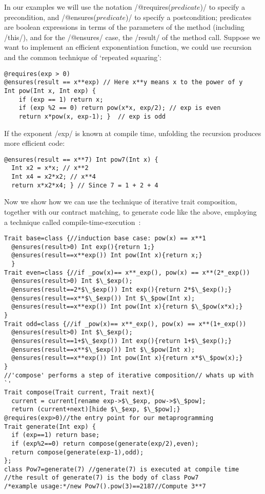 In our examples we will use the notation /@requires($predicate$)/ 
to specify a precondition, and /@ensures($predicate$)/ 
to specify a postcondition; predicates are boolean expressions
in terms of the parameters of the method (including /this/), and for the /@ensures/ case, the /result/ of the method call.
Suppose we want to implement an efficient exponentiation function, we could use recursion and the common technique of `repeated squaring':
\vspace{-1ex}
\begin{lstlisting}
@requires(exp > 0)
@ensures(result == x**exp) // Here x**y means x to the power of y
Int pow(Int x, Int exp) {
	if (exp == 1) return x;
	if (exp %2 == 0) return pow(x*x, exp/2); // exp is even
	return x*pow(x, exp-1); }  // exp is odd
\end{lstlisting}
If the exponent /exp/ is known at compile time,
unfolding the recursion produces more efficient code:
\vspace{-1ex}
\begin{lstlisting}[firstnumber=7]
@ensures(result == x**7) Int pow7(Int x) { 
  Int x2 = x*x; // x**2
  Int x4 = x2*x2; // x**4
  return x*x2*x4; } // Since 7 = 1 + 2 + 4
\end{lstlisting}
Now we show how we can use the technique of iterative trait composition, together with our contract matching, to generate code like the above, employing a technique called compile-time-execution~\cite{sheard2002template}:
\vspace{-1ex}
\begin{lstlisting}[firstnumber=11]
Trait base=class {//induction base case: pow(x) == x**1
  @ensures(result>0) Int exp(){return 1;}  
  @ensures(result==x**exp()) Int pow(Int x){return x;}
  }
Trait even=class {//if _pow(x)== x**_exp(), pow(x) == x**(2*_exp())
  @ensures(result>0) Int $\_$exp();
  @ensures(result==2*$\_$exp()) Int exp(){return 2*$\_$exp();}
  @ensures(result==x**$\_$exp()) Int $\_$pow(Int x);
  @ensures(result==x**exp()) Int pow(Int x){return $\_$pow(x*x);}
}
Trait odd=class {//if _pow(x)== x**_exp(), pow(x) == x**(1+_exp())
  @ensures(result>0) Int $\_$exp();
  @ensures(result==1+$\_$exp()) Int exp(){return 1+$\_$exp();}
  @ensures(result==x**$\_$exp()) Int $\_$pow(Int x);
  @ensures(result==x**exp()) Int pow(Int x){return x*$\_$pow(x);}
}
//'compose' performs a step of iterative composition// whats up with `'
Trait compose(Trait current, Trait next){
  current = current[rename exp->$\_$exp, pow->$\_$pow];
  return (current+next)[hide $\_$exp, $\_$pow];}
@requires(exp>0)//the entry point for our metaprogramming
Trait generate(Int exp) {
  if (exp==1) return base;
  if (exp%2==0) return compose(generate(exp/2),even);
  return compose(generate(exp-1),odd);
};
class Pow7=generate(7) //generate(7) is executed at compile time
//the result of generate(7) is the body of class Pow7
/*example usage:*/new Pow7().pow(3)==2187//Compute 3**7
\end{lstlisting}